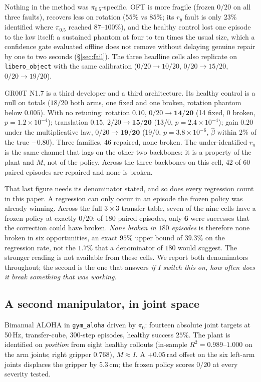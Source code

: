 \documentclass{article}
\newcommand{\code}[1]{\texttt{\small #1}}
\begin{document}
Nothing in the method was $\pi_{0.5}$-specific. OFT is more fragile (frozen $0/20$ on all
three faults), recovers less on rotation ($55\%$ vs $85\%$; its $r_y$ fault is only $23\%$
identified where $\pi_{0.5}$ reached $87$--$100\%$), and the healthy control lost one episode
to the law itself: a sustained phantom at four to ten times the usual size, which a
confidence gate evaluated offline does not remove without delaying genuine repair by one to
two seconds (\S\ref{sec:fail}). The three headline cells also replicate on
\code{libero\_object} with the same calibration ($0/20\to10/20$, $0/20\to15/20$,
$0/20\to19/20$).

GR00T N1.7 is a third developer and a third architecture. Its healthy control is a null on
totals ($18/20$ both arms, one fixed and one broken, rotation phantom below $0.005$). With no retuning: rotation $0.10$,
$0/20\to\mathbf{14/20}$ (14 fixed, 0 broken, $p=1.2\times10^{-4}$); translation $0.15$,
$2/20\to\mathbf{15/20}$ (13/0, $p=2.4\times10^{-4}$); gain $0.20$ under the multiplicative
law, $0/20\to\mathbf{19/20}$ (19/0, $p=3.8\times10^{-6}$, $\hat\beta$ within $2\%$ of the
true $-0.80$). Three families, 46 repaired, none broken. The under-identified $r_y$ is the same channel that lags on the other two
backbones: it is a property of the plant and $M$, not of the policy. Across the three
backbones on this cell, 42 of 60 paired episodes are repaired and none is broken.

That last figure needs its denominator stated, and so does every regression count in this
paper. A regression can only occur in an episode the frozen policy was already winning.
Across the full $3\times3$ transfer table, seven of the nine cells have a frozen policy at
exactly $0/20$: of $180$ paired episodes, only $\mathbf{6}$ were successes that the
correction could have broken. \emph{None broken in $180$ episodes} is therefore none broken
in six opportunities, an exact $95\%$ upper bound of $39.3\%$ on the regression rate, not
the $1.7\%$ that a denominator of $180$ would suggest. The stronger reading is not available
from these cells. We report both denominators throughout; the second is the one that answers
\emph{if I switch this on, how often does it break something that was working}.

\subsection{A second manipulator, in joint space}
\label{sec:aloha}

Bimanual ALOHA in \code{gym\_aloha} driven by $\pi_0$: fourteen absolute joint targets at
50\,Hz, transfer-cube, 300-step episodes, healthy success $25\%$. The plant is identified on
\emph{position} from eight healthy rollouts (in-sample $R^2 = 0.989$--$1.000$ on the arm joints; right gripper $0.768$),
$M\approx I$. A $+0.05$\,rad offset on the six left-arm joints displaces the gripper by
$5.3$\,cm; the frozen policy scores $0/20$ at every severity tested.
\end{document}
